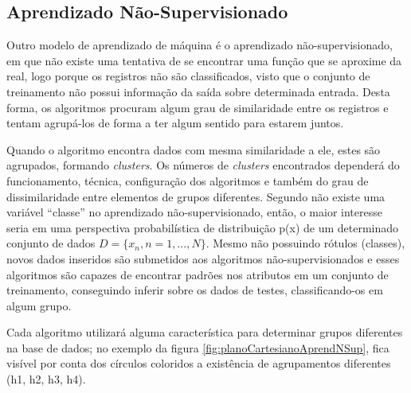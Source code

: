 \subsection{Aprendizado Não-Supervisionado}\label{ssec:aprendNSup}

Outro modelo de aprendizado de máquina é o aprendizado não-supervisionado, em que não existe uma tentativa de se encontrar uma função que se aproxime da real, logo porque os registros não são classificados, visto que o conjunto de treinamento não possui informação da saída sobre determinada entrada. Desta forma, os algoritmos procuram algum grau de similaridade entre os registros e tentam agrupá-los de forma a ter algum sentido para estarem juntos.

Quando o algoritmo encontra dados com mesma similaridade a ele, estes são agrupados, formando \textit{clusters}. Os números de \textit{clusters} encontrados dependerá do funcionamento, técnica, configuração dos algoritmos e também do grau de dissimilaridade entre elementos de grupos diferentes. Segundo  não existe uma variável “classe” no aprendizado não-supervisionado, então, o maior interesse seria em uma perspectiva probabilística de distribuição p(x) de um determinado conjunto de dados ${D = \{x_{n},n=1,...,N\}}$. Mesmo não possuindo rótulos (classes), novos dados inseridos são submetidos aos algoritmos não-supervisionados e esses algoritmos são capazes de encontrar padrões nos atributos em um conjunto de treinamento, conseguindo inferir sobre os dados de testes, classificando-os em algum grupo.

Cada algoritmo utilizará alguma característica para determinar grupos diferentes na base de dados; no exemplo da figura \ref{fig:planoCartesianoAprendNSup}, fica visível por conta dos círculos coloridos a existência de agrupamentos diferentes (h1, h2, h3, h4). 


